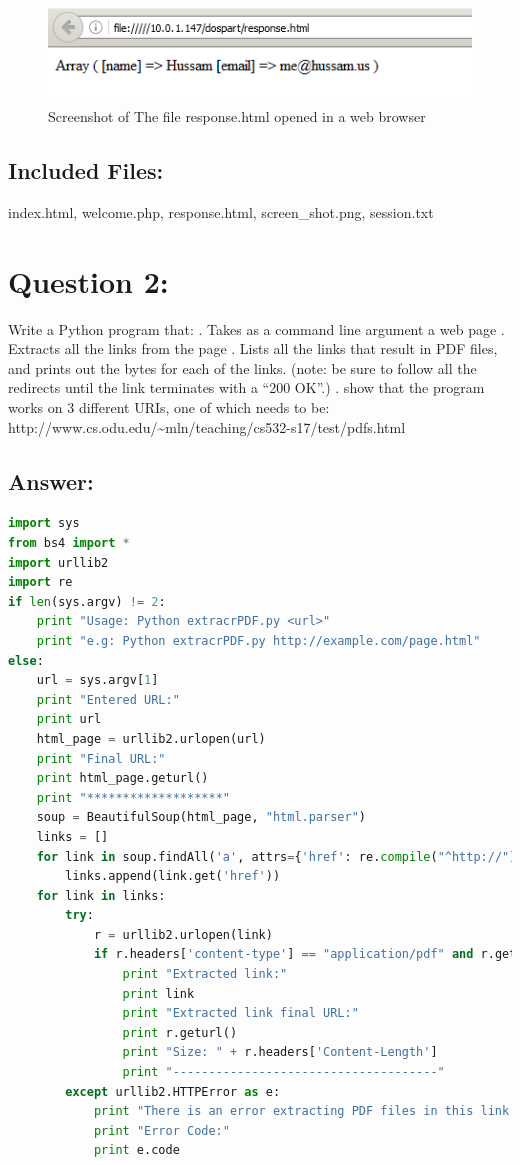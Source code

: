 \documentclass[a4paper, 11pt]{article}
\begin{document}
\begin{figure}[h]
\caption{Screenshot of The file response.html opened in a web browser}
\centering
\includegraphics[scale=0.76]{screen_shot.png}
\end{figure}

\subsection*{Included Files:}
index.html, welcome.php, response.html, screen\_shot.png, session.txt

\section*{Question 2:}
Write a Python program that:
\newline
{}. Takes as a command line argument a web page
\newline
{}. Extracts all the links from the page
\newline
{}. Lists all the links that result in PDF files, and prints out the bytes for each of the links. 
\newline
\indent
(note: be sure to follow all the redirects until the link terminates with a ``200 OK''.)
\newline
{}. show that the program works on 3 different URIs, one of which needs to be:
\newline
\indent
http://www.cs.odu.edu/\textasciitilde mln/teaching/cs532-s17/test/pdfs.html
     
\subsection*{Answer:} 

\begin{lstlisting}[language=python,label=Python-code,caption=The content of extractPDF.py]
import sys
from bs4 import *
import urllib2
import re
if len(sys.argv) != 2:
	print "Usage: Python extracrPDF.py <url>"
	print "e.g: Python extracrPDF.py http://example.com/page.html"
else:
	url = sys.argv[1]
	print "Entered URL:"
	print url
	html_page = urllib2.urlopen(url)
	print "Final URL:"
	print html_page.geturl()
	print "*******************"
	soup = BeautifulSoup(html_page, "html.parser")
	links = []
	for link in soup.findAll('a', attrs={'href': re.compile("^http://")}):
		links.append(link.get('href'))
	for link in links:
		try:
			r = urllib2.urlopen(link)
			if r.headers['content-type'] == "application/pdf" and r.getcode() == 200:
				print "Extracted link:"
				print link
				print "Extracted link final URL:"
				print r.geturl()
				print "Size: " + r.headers['Content-Length']
				print "-------------------------------------"
		except urllib2.HTTPError as e:
			print "There is an error extracting PDF files in this link:"
			print "Error Code:"
			print e.code
\end{lstlisting}
\end{document}
